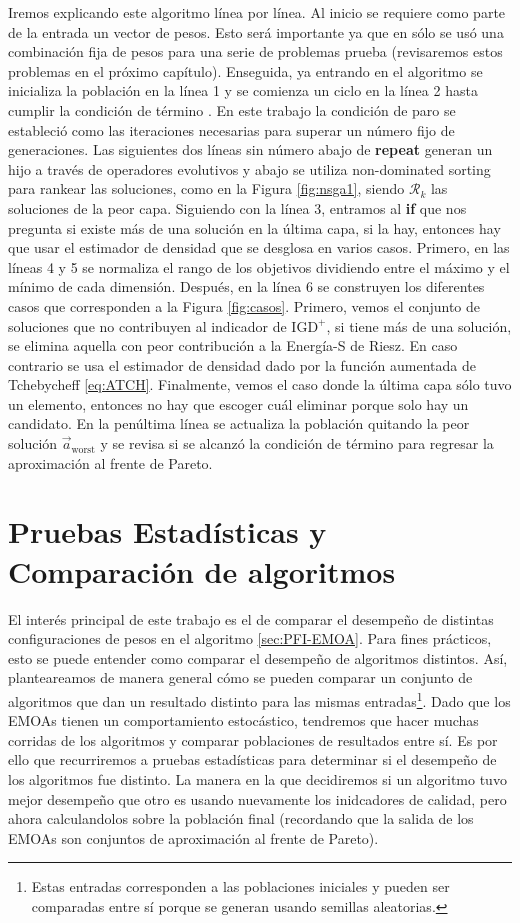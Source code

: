 Iremos explicando este algoritmo línea por línea. Al inicio se requiere como parte de la entrada un vector de pesos. Esto será importante ya que en \cite{PFI} sólo se usó una combinación fija de pesos para una serie de problemas prueba (revisaremos estos problemas en el próximo capítulo). Enseguida, ya entrando en el algoritmo se inicializa la población en la línea 1 y se comienza un ciclo en la línea 2 hasta cumplir la condición de término . En este trabajo la condición de paro se estableció como las iteraciones necesarias para superar un número fijo de generaciones. Las siguientes dos líneas sin número abajo de \textbf{repeat} generan un hijo a través de operadores evolutivos y abajo se utiliza non-dominated sorting para rankear las soluciones, como en la Figura \ref{fig:nsga1}, siendo $\mathcal{R}_k$ las soluciones de la peor capa. 
Siguiendo con la línea 3, entramos al \textbf{if} que nos pregunta si existe más de una solución en la última capa, si la hay, entonces hay que usar el estimador de densidad que se desglosa en varios casos. Primero, en las líneas 4 y 5 se normaliza el rango de los objetivos dividiendo entre el máximo y el mínimo de cada dimensión. Después, en la línea 6 se construyen los diferentes casos que corresponden a la Figura \ref{fig:casos}. Primero, vemos el conjunto de soluciones que no contribuyen al indicador de $\text{IGD}^+$, si tiene más de una solución, se elimina aquella con peor contribución a la Energía-S de Riesz. En caso contrario se usa el estimador de densidad dado por la función aumentada de Tchebycheff \eqref{eq:ATCH}. Finalmente, vemos el caso donde la última capa sólo tuvo un elemento, entonces no hay que escoger cuál eliminar porque solo hay un candidato. En la penúltima línea se actualiza la población quitando la peor solución $\vec{a}_{\text{worst}}$ y se revisa si se alcanzó la condición de término para regresar la aproximación al frente de Pareto. 

\section{Pruebas Estadísticas y Comparación de algoritmos} \label{sec:pruebas_estadisticas}

El interés principal de este trabajo es el de comparar el desempeño de distintas configuraciones de pesos en el algoritmo \ref{sec:PFI-EMOA}. Para fines prácticos, esto se puede entender como comparar el desempeño de algoritmos distintos. Así, planteareamos de manera general cómo se pueden comparar un conjunto de algoritmos que dan un resultado distinto para las mismas entradas\footnote{Estas entradas corresponden a las poblaciones iniciales y pueden ser comparadas entre sí porque se generan usando semillas aleatorias.}. Dado que los EMOAs tienen un comportamiento estocástico, tendremos que hacer muchas corridas de los algoritmos y comparar poblaciones de resultados entre sí. Es por ello que recurriremos a pruebas estadísticas para determinar si el desempeño de los algoritmos fue distinto. La manera en la que decidiremos si un algoritmo tuvo mejor desempeño que otro es usando nuevamente los inidcadores de calidad, pero ahora calculandolos sobre la población final (recordando que la salida de los EMOAs son conjuntos de aproximación al frente de Pareto).

